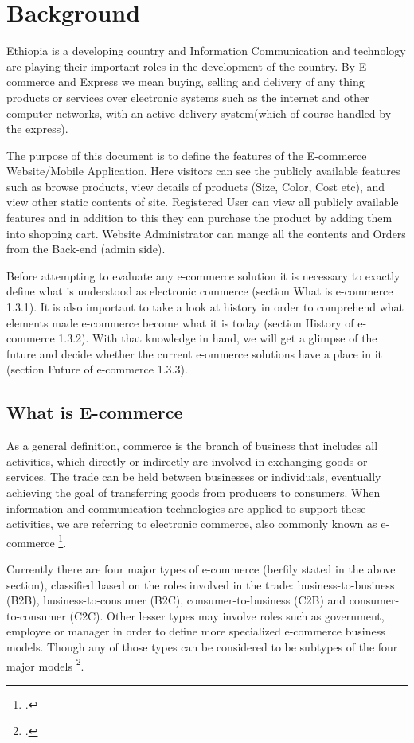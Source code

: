 \section{Background}
Ethiopia is a developing country and Information Communication and technology are playing their important roles in the development of the country. By E-commerce and Express we mean buying, selling and delivery of any thing products or services over electronic systems such as the internet and other computer networks, with an active delivery system(which of course handled by the express).

The purpose of this document is to define the features of the E-commerce Website/Mobile Application. Here visitors can see the publicly available features such as browse products, view details of products (Size, Color, Cost etc), and view other static contents of site. Registered User can view all publicly available features and in addition to this they can purchase the product by adding them into shopping cart. Website Administrator can mange all the contents and Orders from the Back-end (admin side).

Before attempting to evaluate any e-commerce solution it is necessary to exactly define what is understood as electronic commerce (section What is e-commerce 1.3.1). It is also important to take a look at history in order to comprehend what elements made e-commerce become what it is today (section History of e-commerce 1.3.2). With that knowledge in hand, we will get a glimpse of the future and decide whether the current e-ommerce solutions have a place in it (section Future of e-commerce 1.3.3).

\subsection{What is E-commerce}

As a general definition, commerce is the branch of business that includes all activities, which directly or indirectly are involved in exchanging goods or services. The trade can be held between businesses or individuals, eventually achieving the goal of transferring goods from producers to consumers. When information and communication technologies are applied to support these activities, we are referring to electronic commerce, also commonly known as e-commerce \footcite{Akr11}.

Currently there are four major types of e-commerce (berfily stated in the above section), classified based on the roles involved in the trade: business-to-business (B2B), business-to-consumer (B2C), consumer-to-business (C2B) and consumer-to-consumer (C2C). Other lesser types may involve roles such as government, employee or manager in order to define more specialized e-commerce business models. Though any of those types can be considered to be subtypes of the four major models \footcite{Nem11}.

